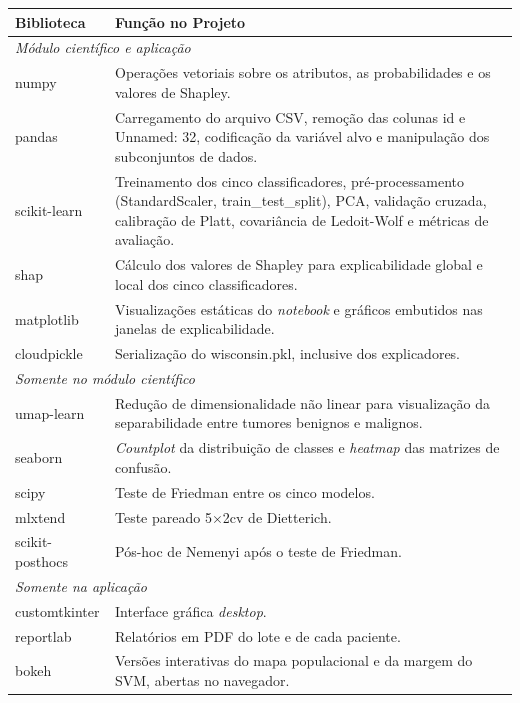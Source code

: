 \documentclass[
    12pt
    ,oneside
    ,a4paper
    ,chapter=TITLE
    ,section=TITLE
    ,sumario=abnt-6027-2012
    ,english,brazil]{abntex2} %
\begin{document}
\begin{quadro}[ht]
    \centering
    \begin{tabular}{|l|p{12.6cm}|}
        \hline
        \textbf{Biblioteca} & \textbf{Função no Projeto} \\
        \hline
        \multicolumn{2}{|l|}{\textit{Módulo científico e aplicação}} \\ \hline
        numpy & Operações vetoriais sobre os atributos, as probabilidades e os
                valores de Shapley. \\ \hline
        pandas & Carregamento do arquivo CSV, remoção das colunas id e Unnamed: 32,
                 codificação da variável alvo e manipulação dos subconjuntos de dados. \\ \hline
        scikit-learn & Treinamento dos cinco classificadores, pré-processamento
                       (StandardScaler, train\_test\_split), PCA, validação cruzada,
                       calibração de Platt, covariância de Ledoit-Wolf e métricas de
                       avaliação. \\ \hline
        shap & Cálculo dos valores de Shapley para explicabilidade global e local
               dos cinco classificadores. \\ \hline
        matplotlib & Visualizações estáticas do \textit{notebook} e gráficos embutidos
                     nas janelas de explicabilidade. \\ \hline
        cloudpickle & Serialização do wisconsin.pkl, inclusive dos explicadores. \\ \hline
        \multicolumn{2}{|l|}{\textit{Somente no módulo científico}} \\ \hline
        umap-learn & Redução de dimensionalidade não linear para visualização da
                     separabilidade entre tumores benignos e malignos. \\ \hline
        seaborn & \textit{Countplot} da distribuição de classes e \textit{heatmap}
                  das matrizes de confusão. \\ \hline
        scipy & Teste de Friedman entre os cinco modelos. \\ \hline
        mlxtend & Teste pareado 5$\times$2cv de Dietterich. \\ \hline
        scikit-posthocs & Pós-hoc de Nemenyi após o teste de Friedman. \\ \hline
        \multicolumn{2}{|l|}{\textit{Somente na aplicação}} \\ \hline
        customtkinter & Interface gráfica \textit{desktop}. \\ \hline
        reportlab & Relatórios em PDF do lote e de cada paciente. \\ \hline
        bokeh & Versões interativas do mapa populacional e da margem do SVM, abertas
                no navegador. \\ \hline
    \end{tabular}
    \vspace{0.2cm}
    \fonteautor
\end{quadro}
\end{document}

